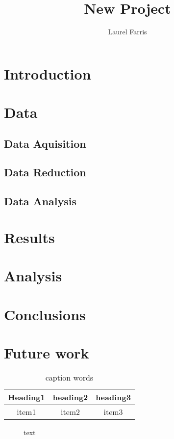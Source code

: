 \documentclass[preprint]{aastex}
\begin{document}
\title{New Project}
\author{Laurel Farris}

\begin{abstract}
\end{abstract}

\section{Introduction}\label{intro}
\section{Data}
\subsection{Data Aquisition}
\subsection{Data Reduction}
\subsection{Data Analysis}
\section{Results}
\section{Analysis}
\section{Conclusions}
\section{Future work}


\begin{table}[h]
    \centering
    \begin{tabular}{c c c}
        \hline\hline
        Heading1 & heading2 & heading3 \\
        \hline
        item1 & item2 & item3 \\
    \end{tabular}
    \caption{caption words}
    \label{labelname}
\end{table}

\begin{figure}[htb!]  %
    \caption{text}
\end{figure}



\end{document}

